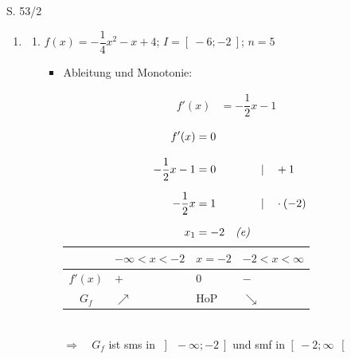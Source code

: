 \begin{Exercise}{S. 53/2}{}
\begin{enumerate}[leftmargin=*]
    \item [2.]\begin{enumerate}[label=\alph*),leftmargin=*]
        \item [a)] {
            $f(x) = -\dfrac{1}{4} x^{2} - x + 4$; \quad $I = \left[ \ -6; -2 \  \right]$; \quad $n = 5$ \\
            \begin{itemize}[leftmargin=*]
                \item Ableitung und Monotonie: \\[-2.0ex]{
                    \begin{align*}
                        f'(x) &= -\dfrac{1}{2} x - 1 &&
                    \end{align*}
                    \begin{minipage}[t]{0.35\linewidth}
                        \begin{align*}
                            f'(x) &= 0 \\[2.0ex]
                            -\dfrac{1}{2} x - 1 &= 0 &&| \quad + 1\\[1.5ex]
                            -\dfrac{1}{2} x &= 1 &&| \quad \cdot (-2)\\[1.5ex]
                            x_{1} &= -2 \quad \text{\textit{(e)}} &&\\[-1.0ex]
                        \end{align*}
                    \end{minipage}
                    \hfill
                    \begin{minipage}[t]{0.55\linewidth}
                        \vspace{0pt}
                        \begin{tabularx}{0.95\linewidth}{c|X|X|X}
                            & $-\infty < x < -2$ & $x = -2$ & $-2 < x < \infty$ \\ \hline
                            $f'(x)$ & $+$ & $0$ & $-$ \\ \hline
                            $G_{f}$ & $\nearrow$ & HoP & $\searrow$ \\           
                        \end{tabularx}
                    \end{minipage}\\
                    $\Rightarrow \quad G_{f}$ ist sms in $\left] \ -\infty; -2 \ \right]$ und smf in $\left[ \ -2; \infty \ \right[$\\[-1.0ex]
}
\end{itemize}}
\end{enumerate}
\end{enumerate}
\end{Exercise}
